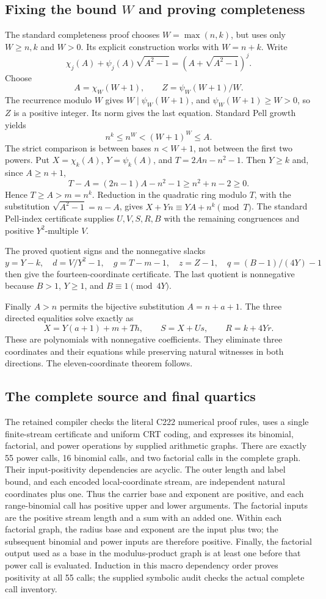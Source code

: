 \subsection{Fixing the bound \texorpdfstring{$W$}{W} and proving completeness}
The standard completeness proof chooses $W=\max(n,k)$, but uses only
$W\ge n,k$ and $W>0$. Its explicit construction works with $W=n+k$.
Write
\[
 \chi_j(A)+\psi_j(A)\sqrt{A^2-1}
 =(A+\sqrt{A^2-1})^j.
\]
Choose
\[
 A=\chi_W(W+1),\qquad Z=\psi_W(W+1)/W.
\]
The recurrence modulo $W$ gives $W\mid\psi_W(W+1)$, and
$\psi_W(W+1)\ge W>0$, so $Z$ is a positive integer. Its norm gives
the last equation. Standard Pell growth yields
\[
 n^k\le n^W<(W+1)^W\le A.
\]
The strict comparison is between bases $n<W+1$, not between the first
two powers. Put $X=\chi_k(A)$, $Y=\psi_k(A)$, and
$T=2An-n^2-1$. Then $Y\ge k$ and, since $A\ge n+1$,
\[
 T-A=(2n-1)A-n^2-1\ge n^2+n-2\ge0.
\]
Hence $T\ge A>m=n^k$. Reduction in the quadratic ring modulo $T$,
with the substitution $\sqrt{A^2-1}=n-A$, gives
$X+Yn\equiv YA+n^k\pmod T$.
The standard Pell-index certificate supplies $U,V,S,R,B$ with the
remaining congruences and positive $Y^2$-multiple $V$.

The proved quotient signs and the nonnegative slacks
\[
 y=Y-k,\quad d=V/Y^2-1,\quad g=T-m-1,\quad z=Z-1,
 \quad q=(B-1)/(4Y)-1
\]
then give the fourteen-coordinate certificate. The last quotient is
nonnegative because $B>1$, $Y\ge1$, and $B\equiv1\pmod{4Y}$.

Finally $A>n$ permits the bijective substitution $A=n+a+1$.
The three directed equalities solve exactly as
\[
 X=Y(a+1)+m+Th,\qquad S=X+Us,\qquad R=k+4Yr.
\]
These are polynomials with nonnegative coefficients. They eliminate
three coordinates and their equations while preserving natural witnesses
in both directions. The eleven-coordinate theorem follows.

\subsection{The complete source and final quartics}
The retained compiler checks the literal C222 numerical proof rules,
uses a single finite-stream certificate and uniform CRT coding, and
expresses its binomial, factorial, and power operations by supplied
arithmetic graphs. There are exactly 55 power calls, 16 binomial calls,
and two factorial calls in the complete graph. Their input-positivity
dependencies are acyclic. The outer length and label bound, and each
encoded local-coordinate stream, are independent natural coordinates plus one.
Thus the carrier base and exponent are positive, and each range-binomial
call has positive upper and lower arguments. The factorial inputs are
the positive stream length and a sum with an added one. Within each
factorial graph, the radius base and exponent are the input plus two;
the subsequent binomial and power inputs are therefore positive. Finally,
the factorial output used as a base in the modulus-product graph is at
least one before that power call is evaluated. Induction in this macro
dependency order proves positivity at all 55 calls; the supplied symbolic
audit checks the actual complete call inventory.

